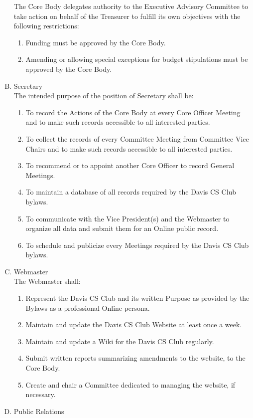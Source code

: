 \documentclass{article}
\newenvironment{li}{
\begin{enumerate}
  \setlength{\itemsep}{1pt}
  \setlength{\parskip}{0pt}
  \setlength{\parsep}{0pt}
}{\end{enumerate}}
\begin{document}
\begin{enumerate}[A.]
	\noindent The Core Body delegates authority to the Executive Advisory Committee to take action on behalf of the Treasurer to fulfill its own objectives with the following restrictions:
	\begin{li}
	\item Funding must be approved by the Core Body.
	\item Amending or allowing special exceptions for budget stipulations must be approved by the Core Body.
	\end{li}
\item Secretary\\
	The intended purpose of the position of Secretary shall be:
	\begin{li}
	\item To record the Actions of the Core Body at every Core Officer Meeting and to make such records accessible to all interested parties.
	\item To collect the records of every Committee Meeting from Committee Vice Chairs and to make such records accessible to all interested parties.
	\item To recommend or to appoint another Core Officer to record General Meetings.
	\item To maintain a database of all records required by the Davis CS Club bylaws.
	\item To communicate with the Vice President(s) and the Webmaster to organize all data and submit them for an Online public record.
	\item To schedule and publicize every Meetings required by the Davis CS Club bylaws.
	\end{li}
\item Webmaster\\
	The Webmaster shall:
	\begin{li}
	\item Represent the Davis CS Club and its written Purpose as provided by the Bylaws as a professional Online persona.
	\item Maintain and update the Davis CS Club Website at least once a week.
	\item Maintain and update a Wiki for the Davis CS Club regularly.
	\item Submit written reports summarizing amendments to the website, to the Core Body.
	\item Create and chair a Committee dedicated to managing the website, if necessary.
	\end{li}
\item Public Relations

\end{enumerate}
\end{document}
